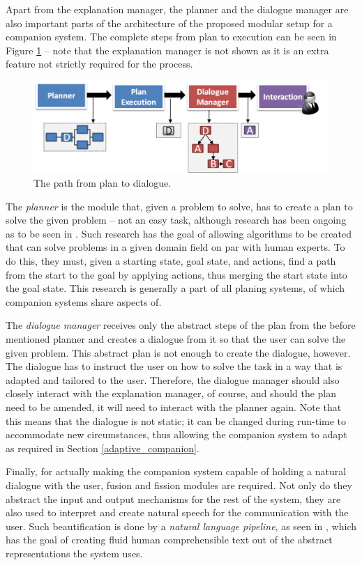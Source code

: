 \documentclass[a4paper]{article}
\begin{document}
Apart from the explanation manager, the planner and the dialogue manager are also important parts of the architecture of the proposed modular setup for a companion system. The complete steps from plan to execution can be seen in Figure \ref{fig:planner} – note that the explanation manager is not shown as it is an extra feature not strictly required for the process.

\begin{figure}[H]
	\centering
	\includegraphics[width=12cm]{planner.png}
	\caption{The path from plan to dialogue.}
	\label{fig:planner}
\end{figure}

The {\it planner} is the module that, given a problem to solve, has to create a plan to solve the given problem – not an easy task, although research has been ongoing as to be seen in \cite{seegebarth2011formale}. Such research has the goal of allowing algorithms to be created that can solve problems in a given domain field on par with human experts. To do this, they must, given a starting state, goal state, and actions, find a path from the start to the goal by applying actions, thus merging the start state into the goal state. This research is generally a part of all planing systems, of which companion systems share aspects of.

The {\it dialogue manager} receives only the abstract steps of the plan from the before mentioned planner and creates a dialogue from it so that the user can solve the given problem. This abstract plan is not enough to create the dialogue, however. The dialogue has to instruct the user on how to solve the task in a way that is adapted and tailored to the user. Therefore, the dialogue manager should also closely interact with the explanation manager, of course, and should the plan need to be amended, it will need to interact with the planner again. Note that this means that the dialogue is not static; it can be changed during run-time to accommodate new circumstances, thus allowing the companion system to adapt as required in Section \ref{adaptive_companion}.

Finally, for actually making the companion system capable of holding a natural dialogue with the user, fusion and fission modules are required. Not only do they abstract the input and output mechanisms for the rest of the system, they are also used to interpret and create natural speech for the communication with the user. Such beautification is done by a {\it natural language pipeline}, as seen in \cite{reiter2000building}, which has the goal of creating fluid human comprehensible text out of the abstract representations the system uses.
\end{document}
